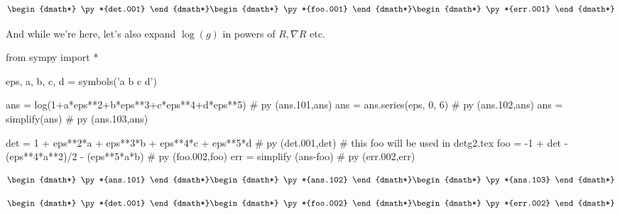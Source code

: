 \documentclass[12pt]{pylatex}
\begin{document}
\begin{dgroup*}
   \begin{dmath*} \py*{det.001} \end{dmath*}
   \begin{dmath*} \py*{foo.001} \end{dmath*}
   \begin{dmath*} \py*{err.001} \end{dmath*}
\end{dgroup*}

\clearpage

And while we're here, let's also expand $\log(g)$ in powers of $R,\nabla R$ etc.

\begin{python}
   from sympy import *

   eps, a, b, c, d = symbols('\epsilon a b c d')

   ans = log(1+a*eps**2+b*eps**3+c*eps**4+d*eps**5)    # py (ans.101,ans)
   ans = ans.series(eps, 0, 6)                         # py (ans.102,ans)
   ans = simplify(ans)                                 # py (ans.103,ans)

   det = 1 + eps**2*a + eps**3*b + eps**4*c + eps**5*d   # py (det.001,det)
   # this foo will be used in detg2.tex
   foo = -1 + det - (eps**4*a**2)/2 - (eps**5*a*b)       # py (foo.002,foo)
   err = simplify (ans-foo)   # py (err.002,err)
\end{python}

\begin{dgroup*}
   \begin{dmath*} \py*{ans.101} \end{dmath*}
   \begin{dmath*} \py*{ans.102} \end{dmath*}
   \begin{dmath*} \py*{ans.103} \end{dmath*}
\end{dgroup*}

\begin{dgroup*}
   \begin{dmath*} \py*{det.001} \end{dmath*}
   \begin{dmath*} \py*{foo.002} \end{dmath*}
   \begin{dmath*} \py*{err.002} \end{dmath*}
\end{dgroup*}
\end{document}
